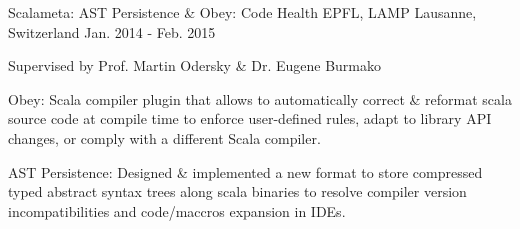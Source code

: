 \begin{cventries}
\cventry
{Scalameta: AST Persistence \& Obey: Code Health}
{EPFL, LAMP}
{Lausanne, Switzerland}
{Jan. 2014 - Feb. 2015}
{
	\begin{cvitems}
	\item{Supervised by Prof. Martin Odersky \& Dr. Eugene Burmako}
	\item{Obey: Scala compiler plugin that allows to automatically correct \& reformat scala source code at compile time to enforce user-defined rules, adapt to library API changes, or comply with a different Scala compiler.}
	\item{AST Persistence: Designed \& implemented a new format to store compressed typed abstract syntax trees along scala binaries to resolve compiler version incompatibilities and code/maccros expansion in IDEs.}
	\end{cvitems}
}



\end{cventries}